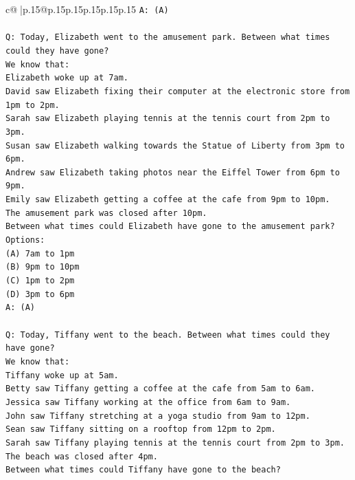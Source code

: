 \documentclass{article}
\begin{document}
{\begin{supertabular}{c@{$\;$}|p{.15\linewidth}@{}p{.15\linewidth}p{.15\linewidth}p{.15\linewidth}p{.15\linewidth}p{.15\linewidth}}
{{{\texttt{A: (A)} \\
\\ 
\texttt{Q: Today, Elizabeth went to the amusement park. Between what times could they have gone?} \\
\texttt{We know that:} \\
\texttt{Elizabeth woke up at 7am.} \\
\texttt{David saw Elizabeth fixing their computer at the electronic store from 1pm to 2pm.} \\
\texttt{Sarah saw Elizabeth playing tennis at the tennis court from 2pm to 3pm.} \\
\texttt{Susan saw Elizabeth walking towards the Statue of Liberty from 3pm to 6pm.} \\
\texttt{Andrew saw Elizabeth taking photos near the Eiffel Tower from 6pm to 9pm.} \\
\texttt{Emily saw Elizabeth getting a coffee at the cafe from 9pm to 10pm.} \\
\texttt{The amusement park was closed after 10pm.} \\
\texttt{Between what times could Elizabeth have gone to the amusement park?} \\
\texttt{Options:} \\
\texttt{(A) 7am to 1pm} \\
\texttt{(B) 9pm to 10pm} \\
\texttt{(C) 1pm to 2pm} \\
\texttt{(D) 3pm to 6pm} \\
\texttt{A: (A)} \\
\\ 
\texttt{Q: Today, Tiffany went to the beach. Between what times could they have gone?} \\
\texttt{We know that:} \\
\texttt{Tiffany woke up at 5am.} \\
\texttt{Betty saw Tiffany getting a coffee at the cafe from 5am to 6am.} \\
\texttt{Jessica saw Tiffany working at the office from 6am to 9am.} \\
\texttt{John saw Tiffany stretching at a yoga studio from 9am to 12pm.} \\
\texttt{Sean saw Tiffany sitting on a rooftop from 12pm to 2pm.} \\
\texttt{Sarah saw Tiffany playing tennis at the tennis court from 2pm to 3pm.} \\
\texttt{The beach was closed after 4pm.} \\
\texttt{Between what times could Tiffany have gone to the beach?} \\
}}}
\end{supertabular}}
\end{document}
